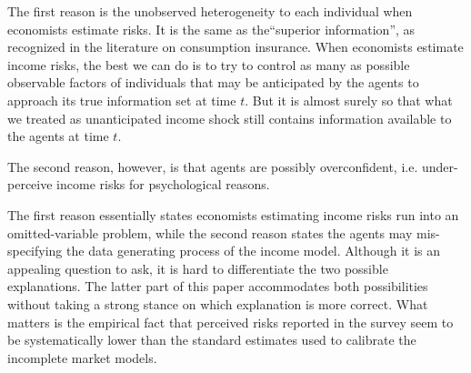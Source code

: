 The first reason is the unobserved heterogeneity to each individual when economists estimate risks. It is the same as the``superior information'', as recognized in the literature on consumption insurance. When economists estimate income risks, the best we can do is to try to control as many as possible observable factors of individuals that may be anticipated by the agents to approach its true information set at time $t$. But it is almost surely so that what we treated as unanticipated income shock still contains information available to the agents at time $t$. 


The second reason, however, is that agents are possibly overconfident, i.e. under-perceive income risks for psychological reasons. 

The first reason essentially states economists estimating income risks run into an omitted-variable problem, while the second reason states the agents may mis-specifying the data generating process of the income model. Although it is an appealing question to ask, it is hard to differentiate the two possible explanations. The latter part of this paper accommodates both possibilities without taking a strong stance on which explanation is more correct. What matters is the empirical fact that perceived risks reported in the survey seem to be systematically lower than the standard estimates used to calibrate the incomplete market models. 